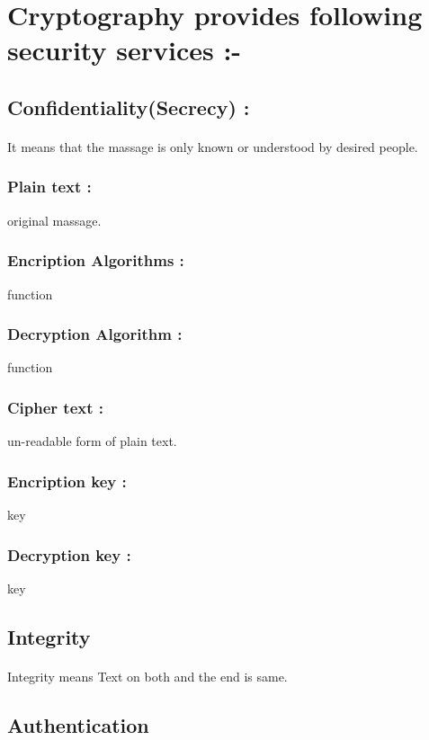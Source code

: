 \documentclass[11pt]{article}
\begin{document}
\section{Cryptography provides following security services :-}
\begin{multicols}{2}
\subsection{Confidentiality(Secrecy) : }
\paragraph{}{It means that the massage is only known or understood by desired people.}

    \subsubsection{Plain text :}original massage.
    \subsubsection{Encription Algorithms :} function
    \subsubsection{Decryption Algorithm :} function
    \subsubsection{Cipher text :} un-readable form of plain text.
    \subsubsection{Encription key :} key
    \subsubsection{Decryption key :} key

\columnbreak

\subsection{Integrity}
\paragraph{}{Integrity means Text on both  and the 
     end is same.}
\subsection{Authentication}

\end{multicols}
\end{document}

